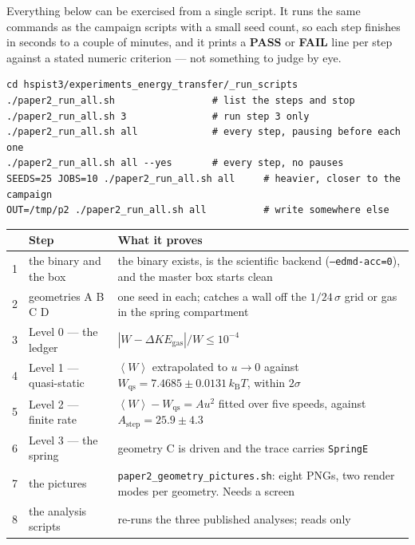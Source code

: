 \documentclass[11pt,a4paper]{article}
\newcommand{\kT}{k_{\mathrm B}T}
\newcommand{\avg}[1]{\left\langle #1 \right\rangle}
\newcommand{\cmd}[1]{\texttt{\footnotesize #1}}
\begin{document}
Everything below can be exercised from a single script. It runs the same commands as the campaign
scripts with a small seed count, so each step finishes in seconds to a couple of minutes, and it
prints a \textbf{PASS} or \textbf{FAIL} line per step against a stated numeric criterion --- not
something to judge by eye.

\begin{howto}
\begin{Verbatim}[fontsize=\footnotesize]
cd hspist3/experiments_energy_transfer/_run_scripts
./paper2_run_all.sh                 # list the steps and stop
./paper2_run_all.sh 3               # run step 3 only
./paper2_run_all.sh all             # every step, pausing before each one
./paper2_run_all.sh all --yes       # every step, no pauses
SEEDS=25 JOBS=10 ./paper2_run_all.sh all     # heavier, closer to the campaign
OUT=/tmp/p2 ./paper2_run_all.sh all          # write somewhere else
\end{Verbatim}
\end{howto}

\begin{center}\small
\begin{tabular}{@{}clp{8.4cm}@{}}
\toprule
 & Step & What it proves \\
\midrule
1 & the binary and the box     & the binary exists, is the scientific backend (\cmd{--edmd-acc=0}), and the master box starts clean \\
2 & geometries A B C D         & one seed in each; catches a wall off the $1/24\,\sigma$ grid or gas in the spring compartment \\
3 & Level 0 --- the ledger     & $|W - \Delta KE_{\mathrm{gas}}|/W \le 10^{-4}$ \\
4 & Level 1 --- quasi-static   & $\avg W$ extrapolated to $u \to 0$ against $W_{\mathrm{qs}} = 7.4685 \pm 0.0131\,\kT$, within $2\sigma$ \\
5 & Level 2 --- finite rate    & $\avg W - W_{\mathrm{qs}} = A u^2$ fitted over five speeds, against $A_{\mathrm{step}} = 25.9 \pm 4.3$ \\
6 & Level 3 --- the spring     & geometry C is driven and the trace carries \cmd{SpringE} \\
7 & the pictures               & \cmd{paper2\_geometry\_pictures.sh}: eight PNGs, two render modes per geometry. Needs a screen \\
8 & the analysis scripts       & re-runs the three published analyses; reads only \\
\bottomrule
\end{tabular}
\end{center}
\end{document}
